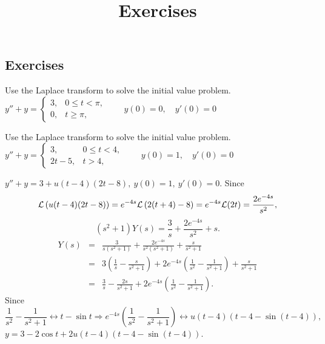 \documentclass{ximera}
\title{Exercises} \license{CC BY-NC-SA 4.0}
\begin{document}
\begin{abstract}
\end{abstract}
\maketitle

\begin{onlineOnly}
\section*{Exercises}
\end{onlineOnly}

\begin{problem}\label{exer:8.5.1} 
Use the Laplace transform to solve the initial value problem.
$y''+y = \left\{\begin{array}{cl} 3,& 0\le t<\pi,\\ 0,&t\ge\pi,\end{array}\right.\qquad y(0)=0, \quad  y'(0)=0$
\end{problem}

\begin{problem}\label{exer:8.5.2} 
Use the Laplace transform to solve the initial value problem.
$y''+y=\left\{\begin{array}{cl} 3,&0\le
t<4,\\ 2t-5,&t > 4,\end{array}\right.\qquad y(0)=1,\quad y'(0)=0$

\begin{solution}
 $y''+y=3+u(t-4)(2t-8),\ y(0)=1,\ y'(0)=0$.
Since
$$
{\cal L}\left(u(t-4)(2t-8)\right)=e^{-4s}{\cal L}\left(2(t+4)-8\right)
=e^{-4s}{\cal L}(2t)=\frac{2e^{-4s}}{s^2},
$$
$$
(s^2+1)Y(s)=\frac{3}{s}+\frac{2e^{-4s}}{s^2}+s.
$$
\begin{eqnarray*}
Y(s)&=&\frac{3}{s(s^2+1)}+\frac{2e^{-4s}}{s^2(s^2+1)}+\frac{s}{s^2+1}\\
&=&3\left(\frac{1}{s}-\frac{s}{s^2+1}\right)+2e^{-4s}
\left(\frac{1}{s^2}-\frac{1}{s^2+1}\right)+\frac{s}{s^2+1}\\
&=&\frac{3}{s}-\frac{2s}{s^2+1}+2e^{-4s}\left(\frac{1}{s^2}-\frac{1}{s^2+1}\right).
\end{eqnarray*}
Since
$$
\frac{1}{s^2}-\frac{1}{s^2+1}\leftrightarrow t-\sin t\Rightarrow
e^{-4s}\left(\frac{1}{s^2}-\frac{1}{s^2+1}\right)\leftrightarrow
u(t-4)\left(t-4-\sin(t-4)\right),
$$
$y=3-2\cos t+2u(t-4)\left(t-4-\sin(t-4)\right)$.
\end{solution}
\end{problem}
\end{document}
